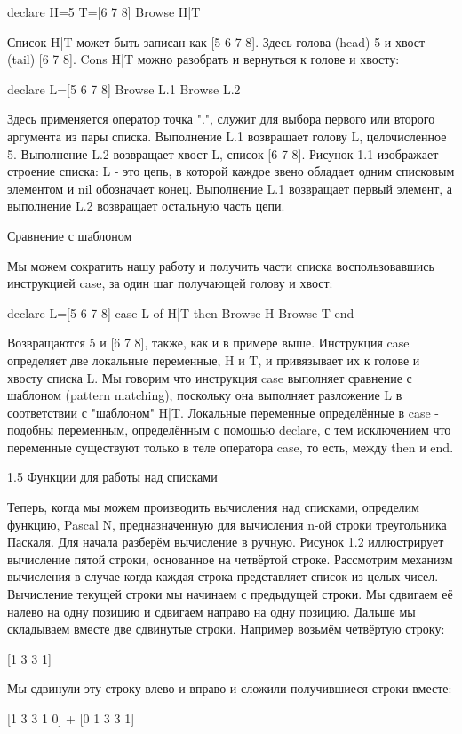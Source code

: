 declare
H=5
T=[6 7 8]
{Browse H|T}

Список H|T может быть записан как [5 6 7 8]. Здесь голова (head) 5 и хвост (tail) [6 7 8]. Cons H|T можно разобрать и вернуться к голове и хвосту:

declare
L=[5 6 7 8]
{Browse L.1}
{Browse L.2}

Здесь применяется оператор точка ".", служит для выбора первого или второго аргумента из пары списка. Выполнение L.1 возвращает голову L, целочисленное 5. Выполнение L.2 возвращает хвост L, список [6 7 8]. Рисунок 1.1 изображает строение списка: L - это цепь, в которой каждое звено обладает одним списковым элементом и nil обозначает конец. Выполнение L.1 возвращает первый элемент, а выполнение L.2 возвращает остальную часть цепи.

Сравнение с шаблоном

Мы можем сократить нашу работу и получить части списка воспользовавшись инструкцией case, за один шаг получающей голову и хвост:

declare
L=[5 6 7 8]
case L of H|T then {Browse H} {Browse T} end

Возвращаются 5 и [6 7 8], также, как и в примере выше. Инструкция case определяет две локальные переменные, H и T, и привязывает их к голове и хвосту списка L. Мы говорим что инструкция case выполняет сравнение с шаблоном (pattern matching), поскольку она выполняет разложение L в соответствии с "шаблоном" H|T. Локальные переменные определённые в case - подобны переменным, определённым с помощью declare, с тем исключением что переменные существуют только в теле оператора case, то есть, между then и end.

1.5 Функции для работы над списками

Теперь, когда мы можем производить вычисления над списками, определим функцию, {Pascal N}, предназначенную для вычисления n-ой строки треугольника Паскаля. Для начала разберём вычисление в ручную. Рисунок 1.2 иллюстрирует вычисление пятой строки, основанное на четвёртой строке. Рассмотрим механизм вычисления в случае когда каждая строка представляет список из целых чисел. Вычисление текущей строки мы начинаем с предыдущей строки. Мы сдвигаем её налево на одну позицию и сдвигаем направо на одну позицию. Дальше мы складываем вместе две сдвинутые строки. Например возьмём четвёртую строку:

[1 3 3 1]

Мы сдвинули эту строку влево и вправо и сложили получившиеся строки вместе:

[1 3 3 1 0]
+ [0 1 3 3 1]

